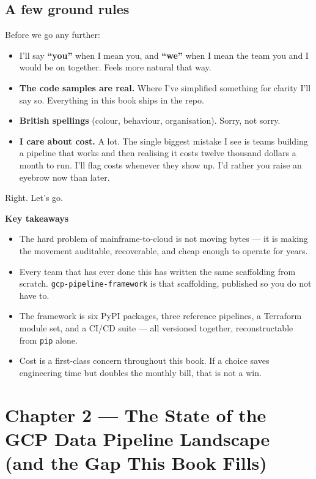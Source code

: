 \documentclass[
  11pt,
  british,
  oneside]{book}
\providecommand{\tightlist}{%
  \setlength{\itemsep}{0pt}\setlength{\parskip}{0pt}}
\begin{document}
\hypertarget{a-few-ground-rules}{%
\section{A few ground rules}\label{a-few-ground-rules}}

Before we go any further:

\begin{itemize}
\tightlist
\item
  I'll say \textbf{``you''} when I mean you, and \textbf{``we''} when I
  mean the team you and I would be on together. Feels more natural that
  way.
\item
  \textbf{The code samples are real.} Where I've simplified something
  for clarity I'll say so. Everything in this book ships in the repo.
\item
  \textbf{British spellings} (colour, behaviour, organisation). Sorry,
  not sorry.
\item
  \textbf{I care about cost.} A lot. The single biggest mistake I see is
  teams building a pipeline that works and then realising it costs
  twelve thousand dollars a month to run. I'll flag costs whenever they
  show up. I'd rather you raise an eyebrow now than later.
\end{itemize}

Right. Let's go.

\begin{takeaways}
\textbf{Key takeaways}
\begin{itemize}
  \item The hard problem of mainframe-to-cloud is not moving bytes — it is making the movement auditable, recoverable, and cheap enough to operate for years.
  \item Every team that has ever done this has written the same scaffolding from scratch. \texttt{gcp-pipeline-framework} is that scaffolding, published so you do not have to.
  \item The framework is six PyPI packages, three reference pipelines, a Terraform module set, and a CI/CD suite — all versioned together, reconstructable from \texttt{pip} alone.
  \item Cost is a first-class concern throughout this book. If a choice saves engineering time but doubles the monthly bill, that is not a win.
\end{itemize}
\end{takeaways}

\newpage

\hypertarget{chapter-2-the-state-of-the-gcp-data-pipeline-landscape-and-the-gap-this-book-fills}{%
\chapter{Chapter 2 --- The State of the GCP Data Pipeline Landscape (and
the Gap This Book
Fills)}\label{chapter-2-the-state-of-the-gcp-data-pipeline-landscape-and-the-gap-this-book-fills}}
\end{document}
